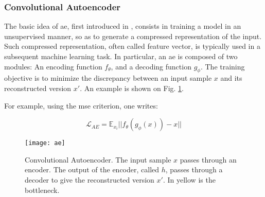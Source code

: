 \subsubsection{Convolutional Autoencoder}
The basic idea of \gls{ae}, first introduced in \cite{vincent10}, consists in training a model in an unsupervised manner, so as to generate a compressed representation of the input.
Such compressed representation, often called feature vector, is typically used in a subsequent machine learning task.
In particular, an \gls{ae} is composed of two modules: An encoding function $f_{\theta}$, and a decoding function $g_{\phi}$.
The training objective is to minimize the discrepancy between an input sample $x$ and its reconstructed version $x'$.
An example is shown on Fig. \ref{fig:ae}.

For example, using the \gls{mse} criterion, one writes:

\begin{equation}
\mathcal{L}_{AE} = \mathbb{E}_{x_{i}}||f_{\theta}(g_{\phi}(x)) - x ||
\end{equation}


\begin{figure}[!htpb]
  \centering
  \texttt{[image: ae]}
  \caption{Convolutional Autoencoder.
    The input sample $x$ passes through an encoder.
    The output of the encoder, called $h$, passes through a decoder to give the reconstructed version $x'$.
    In yellow is the bottleneck.}
  \label{fig:ae}
\end{figure}

